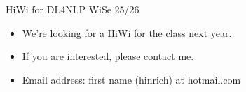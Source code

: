 \begin{vbframe}{HiWi for DL4NLP WiSe 25/26}

\vfill

	\begin{itemize}
\item We're looking for a HiWi for the class next year.
\item If you are interested, please contact me.
\item Email
address:
first name (hinrich) at hotmail.com
\end{itemize}

\vfill

\end{vbframe}



%
%
%
%


\endlecture

